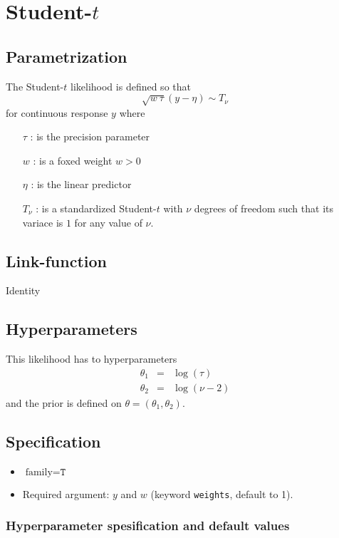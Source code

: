\documentclass[a4paper,11pt]{article}
\begin{document}
\section*{Student-$t$}

\subsection*{Parametrization}

The Student-$t$ likelihood is defined so that 
\[
\sqrt{w\ \tau}(y - \eta)\sim T_{\nu}
\]
for continuous response $y$ where
\begin{itemize}
\item[$\tau$]: is the precision parameter
\item[$w$]: is a foxed weight $w>0$
\item[$\eta$]: is the linear predictor
\item[$T_{\nu}$]: is a standardized Student-$t$ with $\nu$ degrees of
    freedom such that its variace is $1$ for any value of $\nu$.
\end{itemize}
\subsection*{Link-function}

Identity

\subsection*{Hyperparameters}

This likelihood has to hyperparameters
\begin{eqnarray*}
    \theta_1 &=& \log(\tau)\\
    \theta_2&=&\log(\nu-2)
\end{eqnarray*}
and the prior is defined on $\theta=(\theta_1,\theta_2)$. 

\subsection*{Specification}

\begin{itemize}
\item $\text{family}=\texttt{T}$
\item Required argument: $y$ and $w$ (keyword {\tt weights}, default
    to 1).
\end{itemize}

\subsubsection*{Hyperparameter spesification and default values}

\end{document}
